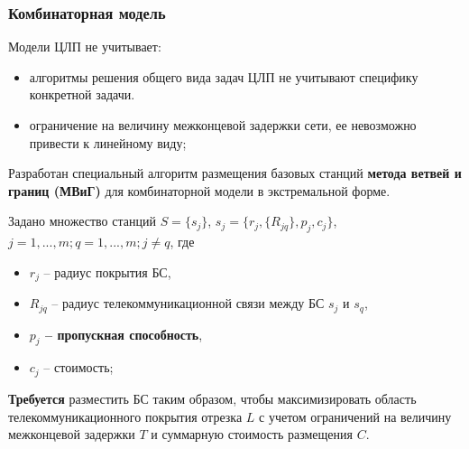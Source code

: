 \begin{frame}
    \frametitle{Комбинаторная модель}
    \justifying
    Модели ЦЛП не учитывает:
    \begin{itemize}
        \item алгоритмы решения общего вида задач ЦЛП не учитывают специфику конкретной задачи.
        \item ограничение на величину межконцевой задержки сети, ее невозможно привести к линейному виду;
    \end{itemize}
    

    \medskip
    Разработан специальный алгоритм размещения базовых станций \textbf{метода ветвей и границ (МВиГ)} для комбинаторной модели в экстремальной форме.

    \medskip

    Задано множество станций $S = \{s_j\}$, $s_j=\{r_j,\{R_{jq} \},p_j, c_j \}$, $j=1,...,m;q=1,...,m;j \neq q $, где 
    \begin{itemize}
        \item $r_j$ -- радиус покрытия БС,
        \item $R_{jq}$ -- радиус телекоммуникационной связи между БС $s_j$ и $s_q$,
        \item \textbf{$p_j$ -- пропускная способность},
        \item $c_j$ -- стоимость;
    \end{itemize} 

    \medskip
    \textbf{Требуется} разместить БС таким образом, чтобы максимизировать область телекоммуникационного покрытия отрезка $L$ с учетом ограничений на величину межконцевой задержки $T$ и суммарную стоимость размещения $C$.


\end{frame}


